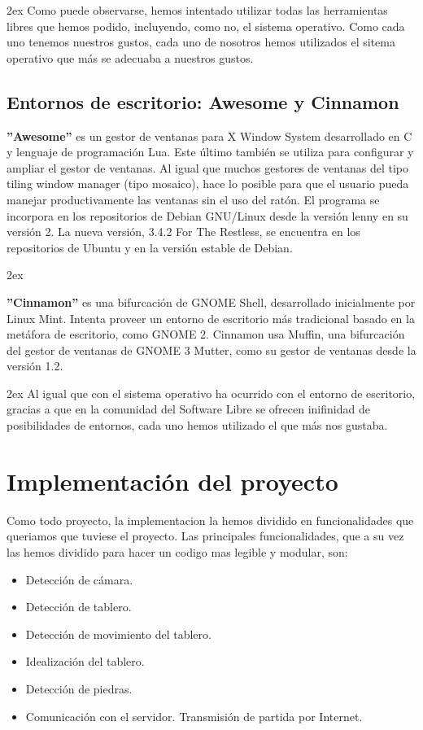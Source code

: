 \documentclass[12pt,a4paper]{report}
\begin{document}
\parskip 2ex
Como puede observarse, hemos intentado utilizar todas las herramientas libres
que hemos podido, incluyendo, como no, el sistema operativo. Como cada uno
tenemos nuestros gustos, cada uno de nosotros hemos utilizados el sitema
operativo que más se adecuaba a nuestros gustos. 


\subsection{Entornos de escritorio: Awesome y Cinnamon}

\textbf{''Awesome''} es un gestor de ventanas para X Window System desarrollado
en C y lenguaje de programación Lua. Este último también se utiliza para
configurar y ampliar el gestor de ventanas. Al igual que muchos gestores de
ventanas del tipo tiling window manager (tipo mosaico), hace lo posible para que
el usuario pueda manejar productivamente las ventanas sin el uso del ratón.  El
programa se incorpora en los repositorios de Debian GNU/Linux desde la versión
lenny en su versión 2. La nueva versión, 3.4.2 For The Restless, se encuentra en
los repositorios de Ubuntu y en la versión estable de Debian.

\parskip 2ex

\textbf{''Cinnamon''} es una bifurcación de GNOME Shell, desarrollado
inicialmente por Linux Mint. Intenta proveer un entorno de escritorio más
tradicional basado en la metáfora de escritorio, como GNOME 2. Cinnamon usa
Muffin, una bifurcación del gestor de ventanas de GNOME 3 Mutter, como su gestor
de ventanas desde la versión 1.2.

\parskip 2ex
Al igual que con el sistema operativo ha ocurrido con el entorno de escritorio,
gracias a que en la comunidad del Software Libre se ofrecen inifinidad de
posibilidades de entornos, cada uno hemos utilizado el que más nos gustaba.

\section{Implementación del proyecto}

Como todo proyecto, la implementacion la hemos dividido en funcionalidades que
queriamos que tuviese el proyecto. Las principales funcionalidades, que a su vez
las hemos dividido para hacer un codigo mas legible y modular, son:
\begin{itemize} 
    \item Detección de cámara.
    \item Detección de tablero.
    \item Detección de movimiento del tablero.
    \item Idealización del tablero.
    \item Detección de piedras.
    \item Comunicación con el servidor. Transmisión de partida por Internet.
\end{itemize}
\end{document}
